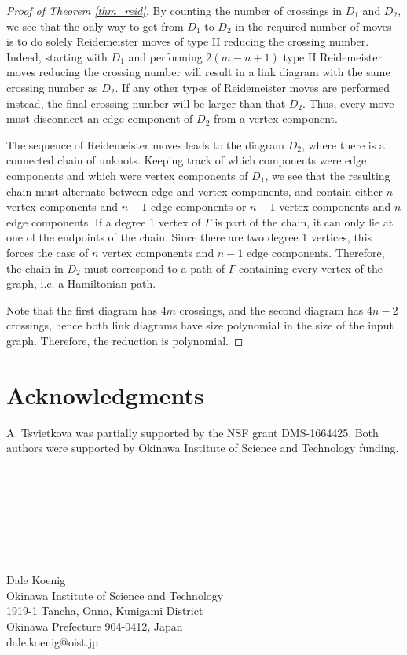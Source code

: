 \documentclass[12pt]{amsart}
\theoremstyle{definition}
\theoremstyle{remark}
\begin{document}
\begin{proof}[Proof of Theorem \ref{thm_reid}]
By counting the number of crossings in $D_1$ and $D_2$, we see that the only way to get from $D_1$ to $D_2$ in the required number of moves is to do solely Reidemeister moves of type II reducing the crossing number. Indeed, starting with $D_1$ and performing $2(m-n+1)$ type II Reidemeister moves reducing the crossing number will result in a link diagram with the same crossing number as $D_2$.  If any other types of Reidemeister moves are performed instead, the final crossing number will be larger than that $D_2$. Thus, every move must disconnect an edge component of $D_2$ from a vertex component.

The sequence of Reidemeister moves leads to the diagram $D_2$, where there is a connected chain of unknots.  Keeping track of which components were edge components and which were vertex components of $D_1$, we see that the resulting chain must alternate between edge and vertex components, and contain either $n$ vertex components and $n-1$ edge components or $n-1$ vertex components and $n$ edge components. If a degree 1 vertex of $\Gamma$ is part of the chain, it can only lie at one of the endpoints of the chain. Since there are two degree 1 vertices, this forces the case of $n$ vertex components and $n-1$ edge components. Therefore, the chain in $D_2$  must correspond to a path of $\Gamma$ containing every vertex of the graph, i.e. a Hamiltonian path.

Note that the first diagram has $4m$ crossings, and the second diagram has $4n-2$ crossings, hence both link diagrams have size polynomial in the size of the input graph. Therefore, the reduction is polynomial.\end{proof}

\section{Acknowledgments}
A. Tsvietkova was partially supported by the NSF grant DMS-1664425. Both authors were supported by Okinawa Institute of Science and Technology funding.


\

\

\


{}

\

Dale Koenig \\
Okinawa Institute of Science and Technology\\
1919-1 Tancha, Onna, Kunigami District\\
Okinawa Prefecture 904-0412, Japan\\
dale.koenig@oist.jp
\end{document}
